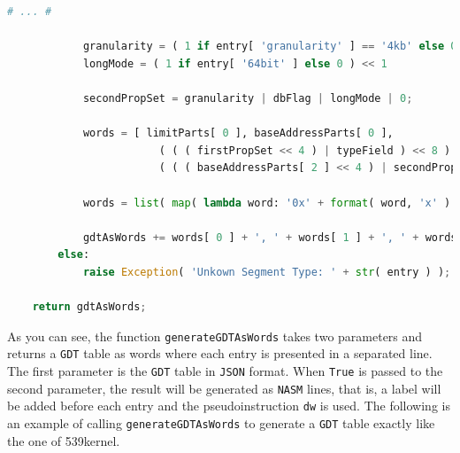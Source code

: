\begin{lstlisting}[language=Python]
            # ... #
            
            granularity = ( 1 if entry[ 'granularity' ] == '4kb' else 0 ) << 3
            longMode = ( 1 if entry[ '64bit' ] else 0 ) << 1
            
            secondPropSet = granularity | dbFlag | longMode | 0;
            
            words = [ limitParts[ 0 ], baseAddressParts[ 0 ],
                        ( ( ( firstPropSet << 4 ) | typeField ) << 8 ) | baseAddressParts[ 1 ],
                        ( ( ( baseAddressParts[ 2 ] << 4 ) | secondPropSet ) << 4 ) | limitParts[ 1 ] ];
                        
            words = list( map( lambda word: '0x' + format( word, 'x' ).zfill( 4 ), words ) );
            
            gdtAsWords += words[ 0 ] + ', ' + words[ 1 ] + ', ' + words[ 2 ] + ', ' + words[ 3 ] + '\n';
        else:
            raise Exception( 'Unkown Segment Type: ' + str( entry ) );
    
    return gdtAsWords;
\end{lstlisting}

As you can see, the function \lstinline!generateGDTAsWords! takes two
parameters and returns a \lstinline!GDT! table as words where each entry
is presented in a separated line. The first parameter is the
\lstinline!GDT! table in \lstinline!JSON! format. When \lstinline!True!
is passed to the second parameter, the result will be generated as
\lstinline!NASM! lines, that is, a label will be added before each entry
and the pseudoinstruction \lstinline!dw! is used. The following is an
example of calling \lstinline!generateGDTAsWords! to generate a
\lstinline!GDT! table exactly like the one of 539kernel.

